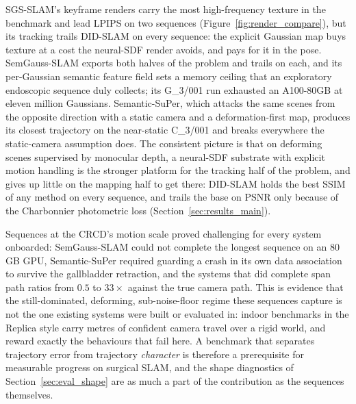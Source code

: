 \documentclass{article}
\begin{document}
SGS-SLAM's keyframe renders carry the most high-frequency texture in the benchmark and lead LPIPS on two sequences (Figure~\ref{fig:render_compare}), but its tracking trails DID-SLAM on every sequence: the explicit Gaussian map buys texture at a cost the neural-SDF render avoids, and pays for it in the pose. SemGauss-SLAM exports both halves of the problem and trails on each, and its per-Gaussian semantic feature field sets a memory ceiling that an exploratory endoscopic sequence duly collects; its G\_3/001 run exhausted an A100-80GB at eleven million Gaussians. Semantic-SuPer, which attacks the same scenes from the opposite direction with a static camera and a deformation-first map, produces its closest trajectory on the near-static C\_3/001 and breaks everywhere the static-camera assumption does. The consistent picture is that on deforming scenes supervised by monocular depth, a neural-SDF substrate with explicit motion handling is the stronger platform for the tracking half of the problem, and gives up little on the mapping half to get there: DID-SLAM holds the best SSIM of any method on every sequence, and trails the base on PSNR only because of the Charbonnier photometric loss (Section~\ref{sec:results_main}).

Sequences at the CRCD's motion scale proved challenging for every system onboarded: SemGauss-SLAM could not complete the longest sequence on an 80\,GB GPU, Semantic-SuPer required guarding a crash in its own data association to survive the gallbladder retraction, and the systems that did complete span path ratios from $0.5$ to $33\times$ against the true camera path. This is evidence that the still-dominated, deforming, sub-noise-floor regime these sequences capture is not the one existing systems were built or evaluated in: indoor benchmarks in the Replica style carry metres of confident camera travel over a rigid world, and reward exactly the behaviours that fail here. A benchmark that separates trajectory error from trajectory \emph{character} is therefore a prerequisite for measurable progress on surgical SLAM, and the shape diagnostics of Section~\ref{sec:eval_shape} are as much a part of the contribution as the sequences themselves.
\end{document}
